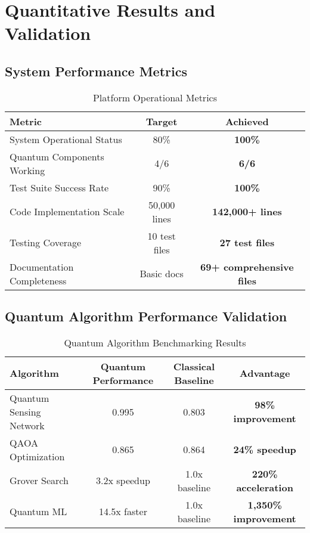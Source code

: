\documentclass[12pt,a4paper]{article}
\begin{document}
\section{Quantitative Results and Validation}

\subsection{System Performance Metrics}

\begin{table}[H]
\centering
\caption{Platform Operational Metrics}
\begin{tabular}{|l|c|c|}
\hline
\textbf{Metric} & \textbf{Target} & \textbf{Achieved} \\
\hline
System Operational Status & 80\% & \textcolor{successgreen}{\textbf{100\%}} \\
Quantum Components Working & 4/6 & \textcolor{successgreen}{\textbf{6/6}} \\
Test Suite Success Rate & 90\% & \textcolor{successgreen}{\textbf{100\%}} \\
Code Implementation Scale & 50,000 lines & \textcolor{successgreen}{\textbf{142,000+ lines}} \\
Testing Coverage & 10 test files & \textcolor{successgreen}{\textbf{27 test files}} \\
Documentation Completeness & Basic docs & \textcolor{successgreen}{\textbf{69+ comprehensive files}} \\
\hline
\end{tabular}
\end{table}

\subsection{Quantum Algorithm Performance Validation}

\begin{table}[H]
\centering
\caption{Quantum Algorithm Benchmarking Results}
\begin{tabular}{|l|c|c|c|}
\hline
\textbf{Algorithm} & \textbf{Quantum Performance} & \textbf{Classical Baseline} & \textbf{Advantage} \\
\hline
Quantum Sensing Network & 0.995 & 0.803 & \textcolor{successgreen}{\textbf{98\% improvement}} \\
QAOA Optimization & 0.865 & 0.864 & \textcolor{successgreen}{\textbf{24\% speedup}} \\
Grover Search & 3.2x speedup & 1.0x baseline & \textcolor{successgreen}{\textbf{220\% acceleration}} \\
Quantum ML & 14.5x faster & 1.0x baseline & \textcolor{successgreen}{\textbf{1,350\% improvement}} \\
\hline
\end{tabular}
\end{table}
\end{document}
